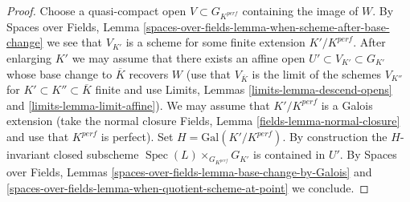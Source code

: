 \documentclass{stacks-project}
\theoremstyle{plain}
\theoremstyle{definition}
\theoremstyle{remark}
\numberwithin{equation}{subsection}
\def\Spec{\mathop{\mathrm{Spec}}}
\begin{document}
\begin{proof}
\medskip\noindent
Choose a quasi-compact open $V \subset G_{K^{perf}}$ containing the
image of $W$. By Spaces over Fields,
Lemma \ref{spaces-over-fields-lemma-when-scheme-after-base-change}
we see that $V_{K'}$ is a scheme for some finite extension $K'/K^{perf}$.
After enlarging $K'$ we may assume that there exists an affine open
$U' \subset V_{K'} \subset G_{K'}$ whose base change to $\overline{K}$
recovers $W$ (use that $V_{\overline{K}}$ is the limit of the schemes
$V_{K''}$ for $K' \subset K'' \subset \overline{K}$ finite and use
Limits, Lemmas \ref{limits-lemma-descend-opens} and
\ref{limits-lemma-limit-affine}). We may assume
that $K'/K^{perf}$ is a Galois extension (take the normal closure
Fields, Lemma \ref{fields-lemma-normal-closure} and use
that $K^{perf}$ is perfect). Set $H = \text{Gal}(K'/K^{perf})$.
By construction the $H$-invariant closed subscheme
$\Spec(L) \times_{G_{K^{perf}}} G_{K'}$ is contained in $U'$.
By
Spaces over Fields, Lemmas
\ref{spaces-over-fields-lemma-base-change-by-Galois} and
\ref{spaces-over-fields-lemma-when-quotient-scheme-at-point} we conclude.
\end{proof}
\end{document}

